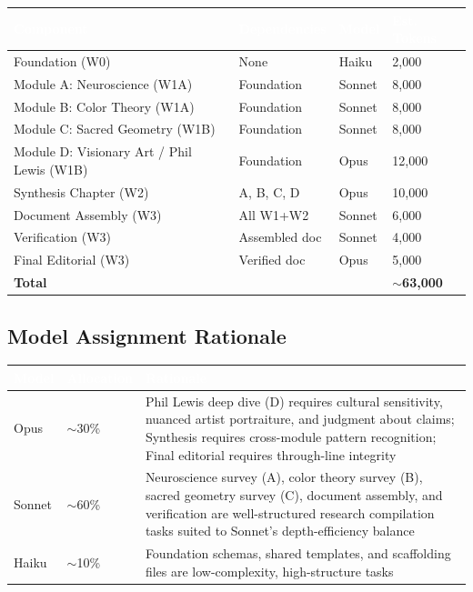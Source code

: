 \documentclass[11pt,letterpaper]{article}
\newcommand{\tableheader}[1]{\textbf{\sffamily\textcolor{white}{#1}}}
\begin{document}
\begin{center}
\begin{tabularx}{\textwidth}{L{3cm}L{2.5cm}C{1.5cm}C{2cm}}
\toprule
{}
\tableheader{Component} & \tableheader{Dependencies} & \tableheader{Model} & \tableheader{Est. Tokens} \\
\midrule
Foundation (W0) & None & Haiku & 2,000 \\
Module A: Neuroscience (W1A) & Foundation & Sonnet & 8,000 \\
Module B: Color Theory (W1A) & Foundation & Sonnet & 8,000 \\
Module C: Sacred Geometry (W1B) & Foundation & Sonnet & 8,000 \\
Module D: Visionary Art / Phil Lewis (W1B) & Foundation & Opus & 12,000 \\
Synthesis Chapter (W2) & A, B, C, D & Opus & 10,000 \\
Document Assembly (W3) & All W1+W2 & Sonnet & 6,000 \\
Verification (W3) & Assembled doc & Sonnet & 4,000 \\
Final Editorial (W3) & Verified doc & Opus & 5,000 \\
\midrule
\textbf{Total} & & & \textbf{$\sim$63,000} \\
\bottomrule
\end{tabularx}
\end{center}

\subsection{Model Assignment Rationale}

\begin{center}
\begin{tabularx}{\textwidth}{L{2cm}L{2cm}X}
\toprule
{}
\tableheader{Model} & \tableheader{Allocation} & \tableheader{Rationale} \\
\midrule
Opus & $\sim$30\% & Phil Lewis deep dive (D) requires cultural sensitivity, nuanced artist portraiture, and judgment about claims; Synthesis requires cross-module pattern recognition; Final editorial requires through-line integrity \\
Sonnet & $\sim$60\% & Neuroscience survey (A), color theory survey (B), sacred geometry survey (C), document assembly, and verification are well-structured research compilation tasks suited to Sonnet's depth-efficiency balance \\
Haiku & $\sim$10\% & Foundation schemas, shared templates, and scaffolding files are low-complexity, high-structure tasks \\
\bottomrule
\end{tabularx}
\end{center}
\end{document}
